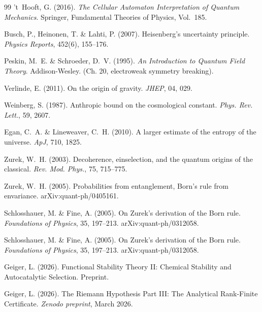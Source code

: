 \documentclass[12pt,a4paper]{article}
\theoremstyle{remark}
\begin{document}
\begin{thebibliography}{99}
't~Hooft, G. (2016).
\newblock \textit{The Cellular Automaton Interpretation of Quantum Mechanics}.
\newblock Springer, Fundamental Theories of Physics, Vol.~185.

Busch, P., Heinonen, T. \& Lahti, P. (2007).
\newblock Heisenberg's uncertainty principle.
\newblock \textit{Physics Reports}, 452(6), 155--176.

Peskin, M.~E. \& Schroeder, D.~V. (1995).
\newblock \textit{An Introduction to Quantum Field Theory}.
\newblock Addison-Wesley. (Ch. 20, electroweak symmetry breaking).

Verlinde, E. (2011).
\newblock On the origin of gravity.
\newblock \textit{JHEP}, 04, 029.

Weinberg, S. (1987).
\newblock Anthropic bound on the cosmological constant.
\newblock \textit{Phys. Rev. Lett.}, 59, 2607.

Egan, C.~A. \& Lineweaver, C.~H. (2010).
\newblock A larger estimate of the entropy of the universe.
\newblock \textit{ApJ}, 710, 1825.

Zurek, W.~H. (2003).
\newblock Decoherence, einselection, and the quantum origins of the classical.
\newblock \textit{Rev. Mod. Phys.}, 75, 715--775.

Zurek, W.~H. (2005).
\newblock Probabilities from entanglement, Born's rule from envariance.
\newblock arXiv:quant-ph/0405161.

Schlosshauer, M. \& Fine, A. (2005).
\newblock On Zurek's derivation of the Born rule.
\newblock \textit{Foundations of Physics}, 35, 197--213. arXiv:quant-ph/0312058.

Schlosshauer, M. \& Fine, A. (2005).
\newblock On Zurek's derivation of the Born rule.
\newblock \textit{Foundations of Physics}, 35, 197--213. arXiv:quant-ph/0312058.

Geiger, L. (2026).
\newblock Functional Stability Theory II: Chemical Stability and Autocatalytic Selection.
\newblock Preprint.

Geiger, L. (2026).
\newblock The Riemann Hypothesis Part III: The Analytical Rank-Finite Certificate.
\newblock \textit{Zenodo preprint}, March 2026.


\end{thebibliography}
\end{document}
